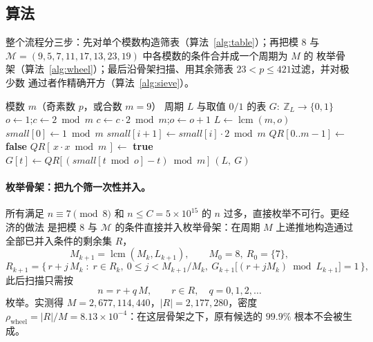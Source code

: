 \documentclass[11pt,a4paper]{ctexart}
\DeclareMathOperator{\Ord}{Ord}
\theoremstyle{remark}
\begin{document}
\subsection{算法}

整个流程分三步：先对单个模数构造筛表（算法~\ref{alg:table}）；再把模 $8$ 与
$\mathcal{M} = (9,5,7,11,17,13,23,19)$ 中各模数的条件合并成一个周期为 $M$ 的
枚举骨架（算法~\ref{alg:wheel}）；最后沿骨架扫描、用其余筛表 $23<p\le 421$过滤，并对极少数
通过者作精确开方（算法~\ref{alg:sieve}）。

\begin{algorithm}[H]
\caption{单模数筛表构建 \textsc{BuildTable}}
\label{alg:table}
\begin{algorithmic}[1]
\Require 模数 $m$（奇素数 $p$，或合数 $m = 9$）
\Ensure 周期 $L$ 与取值 $0/1$ 的表 $G:\ \mathbb{Z}_L \to \{0,1\}$
\State $o \gets 1$;\quad $c \gets 2 \bmod m$
\Comment{求 $o = \Ord_m(2)$，式~\eqref{eq:ord}}
\State $c \gets c \cdot 2 \bmod m$;\quad $o \gets o + 1$
\EndWhile
\State $L \gets \operatorname{lcm}(m, o)$
\State $\mathit{small}[0] \gets 1 \bmod m$
\State $\mathit{small}[i+1] \gets \mathit{small}[i] \cdot 2 \bmod m$
\EndFor
\State $\mathit{QR}[0..m-1] \gets$ \textbf{false}
\State $\mathit{QR}[\,x \cdot x \bmod m\,] \gets$ \textbf{true}
\EndFor
{}
\State $G[t] \gets \mathit{QR}\bigl[\,(\mathit{small}[t \bmod o] - t) \bmod m\,\bigr]$
\EndFor
\State \Return $(L,\ G)$
\end{algorithmic}
\end{algorithm}

\paragraph{枚举骨架：把九个筛一次性并入。} 所有满足 $n \equiv 7 \pmod 8$ 和 $n\le C=5\times 10^{15}$ 
的 $n$ 过多，直接枚举不可行。更经济的做法
是把模 $8$ 与 $\mathcal{M}$ 的条件直接并入枚举骨架：在周期 $M$ 上递推地构造通过
全部已并入条件的剩余集 $R$，
\begin{equation}\label{eq:wheel-period}
M_{k+1} = \operatorname{lcm}(M_k, L_{k+1}), \qquad M_0 = 8,\ R_0 = \{7\},
\end{equation}
\begin{equation}\label{eq:wheel-set}
R_{k+1} = \bigl\{\, r + j\,M_k \;:\; r \in R_k,\ 0 \le j < M_{k+1}/M_k,\ G_{k+1}\bigl[(r + j M_k) \bmod L_{k+1}\bigr] = 1 \,\bigr\},
\end{equation}
此后扫描只需按
\begin{equation}\label{eq:candidate}
n = r + q\,M, \qquad r \in R,\quad q = 0, 1, 2, \dots
\end{equation}
枚举。实测得 $M = 2{,}677{,}114{,}440$，$|R| = 2{,}177{,}280$，密度
$\rho_{\mathrm{wheel}} = |R|/M = 8.13 \times 10^{-4}$：在这层骨架之下，原有候选的
$99.9\%$ 根本不会被生成。
\end{document}
